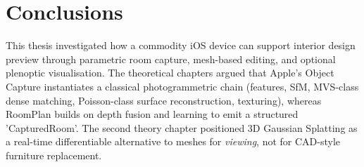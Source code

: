 


\chapter{Conclusions}
\label{ch:conclusions}

This thesis investigated how a commodity iOS device can support interior design preview through parametric room capture, mesh-based editing, and optional plenoptic visualisation. The theoretical chapters argued that Apple's Object Capture instantiates a classical photogrammetric chain (features, SfM, MVS-class dense matching, Poisson-class surface reconstruction, texturing), whereas RoomPlan builds on depth fusion and learning to emit a structured 'CapturedRoom'. The second theory chapter positioned 3D Gaussian Splatting \cite{kerbl20233dgs} as a real-time differentiable alternative to meshes for \emph{viewing}, not for CAD-style furniture replacement.

